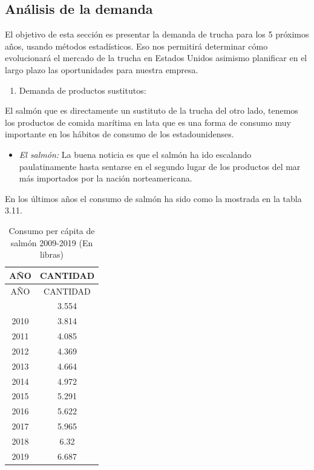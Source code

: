 \documentclass[
  stu,
  floatsintext,
  longtable,
  a4paper,
  nolmodern,
  notxfonts,
  notimes,
  colorlinks=true,linkcolor=blue,citecolor=blue,urlcolor=blue]{apa7}
\providecommand{\tightlist}{%
  \setlength{\itemsep}{0pt}\setlength{\parskip}{0pt}}
\begin{document}
\subsection{Análisis de la demanda}\label{anuxe1lisis-de-la-demanda}

El objetivo de esta sección es presentar la demanda de trucha para los 5
próximos años, usando métodos estadísticos. Eso nos permitirá determinar
cómo evolucionará el mercado de la trucha en Estados Unidos asimismo
planificar en el largo plazo las oportunidades para nuestra empresa.

\begin{enumerate}
\def\labelenumi{\alph{enumi})}
\tightlist
\item
  Demanda de productos sustitutos:
\end{enumerate}

El salmón que es directamente un sustituto de la trucha del otro lado,
tenemos los productos de comida marítima en lata que es una forma de
consumo muy importante en los hábitos de consumo de los estadounidenses.

\begin{itemize}
\tightlist
\item
  \hspace{0pt} \emph{El salmón:} La buena noticia es que el salmón ha
  ido escalando paulatinamente hasta sentarse en el segundo lugar de los
  productos del mar más importados por la nación norteamericana.
\end{itemize}

En los últimos años el consumo de salmón ha sido como la mostrada en la
tabla 3.11.

\begin{longtable}[]{@{}cc@{}}
\caption{Consumo per cápita de salmón 2009-2019 (En
libras)}\tabularnewline
\toprule\noalign{}
AÑO & CANTIDAD \\
\midrule\noalign{}
\endfirsthead
\toprule\noalign{}
AÑO & CANTIDAD \\
\midrule\noalign{}
\endhead
\bottomrule\noalign{}
\endlastfoot
2009 & 3.554 \\
2010 & 3.814 \\
2011 & 4.085 \\
2012 & 4.369 \\
2013 & 4.664 \\
2014 & 4.972 \\
2015 & 5.291 \\
2016 & 5.622 \\
2017 & 5.965 \\
2018 & 6.32 \\
2019 & 6.687 \\
\end{longtable}
\end{document}
